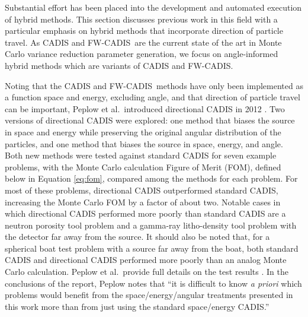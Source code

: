 \documentclass{article} %
\newcommand{\fwc}{\mbox{FW-CADIS}}
\begin{document}
Substantial effort has been placed into the development and automated
execution of hybrid methods. This section discusses previous work in this
field with a particular emphasis on hybrid methods that incorporate
direction of particle travel. As CADIS and \fwc\ are the current state of the
art in Monte Carlo variance reduction parameter generation, we focus on
angle-informed hybrid methods which are variants of CADIS and \fwc.

Noting that the CADIS and \fwc\ methods have only been implemented as a
function space and energy, excluding angle, and that direction of particle
travel can be important, Peplow et al.\ introduced directional CADIS in 2012
\cite{peplow}. Two versions of directional CADIS were explored: one method
that biases the source in space and energy while preserving the original
angular distribution of the particles, and one method that biases the source
in space, energy, and angle. Both new methods were tested against standard
CADIS for seven example problems, with the Monte Carlo calculation Figure of
Merit (FOM), defined below in Equation \eqref{eq:fom}, compared among the
methods for each problem. For most of these problems, directional CADIS
outperformed standard CADIS, increasing the Monte Carlo FOM by a factor of
about two. Notable cases in which directional CADIS performed more poorly than
standard CADIS are a neutron porosity tool problem and a gamma-ray litho-density
 tool problem with the detector far away from the source. It should
also be noted that, for a spherical boat test problem with a source far away
from the boat, both standard CADIS and directional CADIS performed more poorly
than an analog Monte Carlo calculation. Peplow et al.\ provide full details on
the test results \cite{peplow}. In the conclusions of the
report, Peplow notes that ``it is difficult to know \textit{a priori} which
problems would benefit from the space/energy/angular treatments presented in
this work more than from just using the standard space/energy CADIS.''
\end{document}
